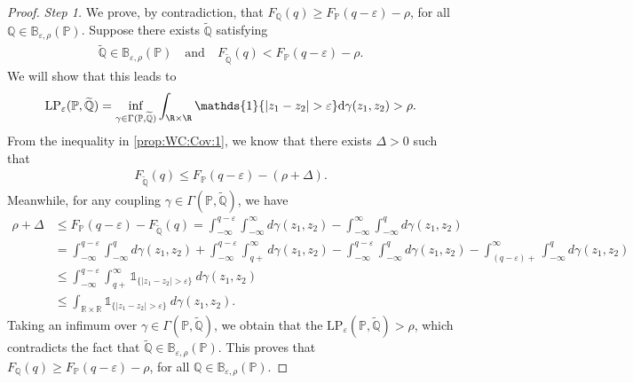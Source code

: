 \documentclass[11pt,a4paper]{article}
\begin{document}
\begin{proof}
\noindent\emph{Step 1.} We prove, by contradiction, that $F_{\mathbb Q}(q) \geq F_{\mathbb P}(q - \varepsilon) - \rho$, for all $\mathbb Q \in \mathbb{B}_{\varepsilon, \rho}(\mathbb P)$. Suppose there exists $\widetilde{\mathbb Q}$ satisfying 
\begin{align}
\label{prop:WC:Cov:1}
    \widetilde{\mathbb Q} \in \mathbb{B}_{\varepsilon, \rho}(\mathbb P) \quad \text{and} \quad F_{\widetilde{\mathbb Q}}(q) < F_{\mathbb P}(q - \varepsilon) - \rho.
\end{align} 
We will show that this leads to
\begin{align*}
    \text{LP}_\varepsilon(\mathbb P, \widetilde{\mathbb Q}) = \inf_{\gamma\in\Gamma(\mathbb P, \widetilde{\mathbb Q})}\int_{\R\times\R} \mathds{1}\{|z_1 - z_2| > \varepsilon\}\mathrm{d}\gamma(z_1,z_2) > \rho.
\end{align*}
From the inequality in \eqref{prop:WC:Cov:1}, we know that there exists $\Delta > 0$ such that
\begin{align*}
    F_{\widetilde{\mathbb Q}}(q) \leq F_{\mathbb P}(q - \varepsilon)-(\rho+\Delta).
\end{align*}
Meanwhile, for any coupling $\gamma\in\Gamma(\mathbb P, \widetilde{\mathbb Q})$, we have
\begin{align*}
    \rho+\Delta &\leq F_{\mathbb P}(q-\varepsilon) - F_{\widetilde{\mathbb Q}}(q)
     = \int_{-\infty}^{q-\varepsilon}\int_{-\infty}^\infty d\gamma(z_1,z_2) - \int_{-\infty}^\infty \int_{-\infty}^{q} d\gamma(z_1,z_2)\\
    &=\int_{-\infty}^{q-\varepsilon}\int_{-\infty}^{q} d\gamma(z_1,z_2)+\int_{-\infty}^{q-\varepsilon}\int_{q+}^\infty d\gamma(z_1,z_2)-\int_{-\infty}^{q-\varepsilon} \int_{-\infty}^{q} d\gamma(z_1,z_2)-\int_{(q-\varepsilon)+}^\infty \int_{-\infty}^{q} d\gamma(z_1,z_2)\\
    &\leq\int_{-\infty}^{q-\varepsilon}\int_{q+}^\infty \mathds{1}_{\{|z_1-z_2|> \varepsilon\}}~d\gamma(z_1,z_2)\\
    &\leq\int_{\mathbb{R}\times\mathbb{R}} \mathds{1}_{\{|z_1-z_2|> \varepsilon\}}~d\gamma(z_1,z_2).
\end{align*}
Taking an infimum over $\gamma\in\Gamma(\mathbb P, \widetilde{\mathbb Q})$, we obtain that the $\text{LP}_\varepsilon(\mathbb P, \widetilde{\mathbb Q})>\rho$, which contradicts the fact that $\widetilde{\mathbb Q} \in \mathbb{B}_{\varepsilon, \rho}(\mathbb P)$. This proves that $F_{\mathbb Q}(q) \geq F_{\mathbb P}(q - \varepsilon) - \rho$, for all $\mathbb Q \in \mathbb{B}_{\varepsilon, \rho}(\mathbb P)$.


\end{proof}
\end{document}
